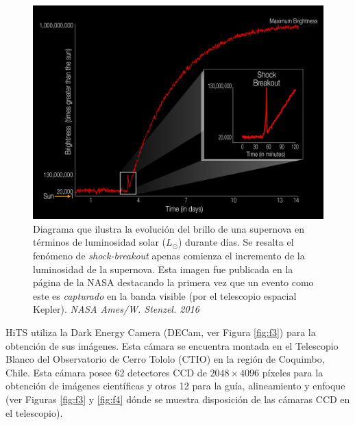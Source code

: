 

\begin{figure}[h!]
\centering
\includegraphics[scale=.25]{images/breakout}
\caption{Diagrama que ilustra la evoluci\'on del brillo de una supernova en t\'erminos de luminosidad solar ($L_{\odot}$) durante d\'ias. Se resalta el fen\'omeno de \textit{shock-breakout} apenas comienza el incremento de la luminosidad de la supernova. Esta imagen fue publicada en la p\'agina de la NASA destacando la primera vez que un evento como este es \textit{capturado} en la banda visible (por el telescopio espacial Kepler). \textit{NASA Ames/W. Stenzel. 2016}}
\label{fig:f2}
\end{figure}

HiTS utiliza la Dark Energy Camera (DECam, ver Figura \ref{fig:f3}) para la obtenci\'on de sus im\'agenes. Esta c\'amara se encuentra montada en el Telescopio Blanco del Observatorio de Cerro Tololo (CTIO) en la regi\'on de Coquimbo, Chile. Esta c\'amara posee 62 detectores CCD de $2048 \times 4096$ p\'ixeles para la obtenci\'on de im\'agenes cient\'ificas y otros 12 para la gu\'ia, alineamiento y enfoque (ver Figuras \ref{fig:f3} y \ref{fig:f4} d\'onde se muestra disposici\'on de las c\'amaras CCD en el telescopio). 
\bigskip


